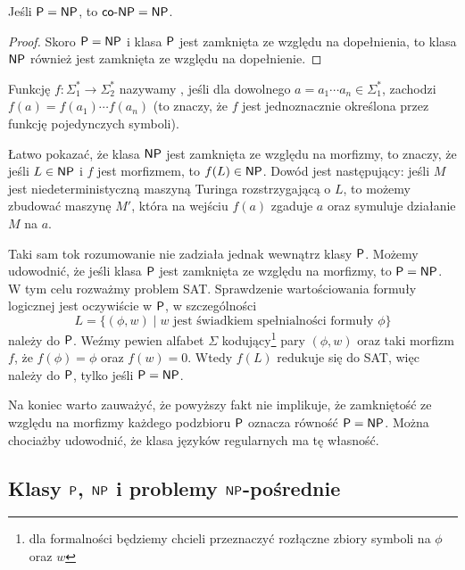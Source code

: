 \begin{theorem}
    Jeśli $\textsf{P} = \textsf{NP}$, to $\textsf{co-NP} = \textsf{NP}$.
\end{theorem}
\begin{proof}
    Skoro $\textsf{P} = \textsf{NP}$ i klasa $\textsf{P}$ jest zamknięta ze względu na dopełnienia, to klasa $\textsf{NP}$ również jest zamknięta ze względu na dopełnienie.
\end{proof}

\begin{remark}
    Funkcję $f : \Sigma_1^* \to \Sigma_2^*$ nazywamy , jeśli dla dowolnego $a = a_1 \cdots a_n \in \Sigma_1^*$, zachodzi $f(a) = f(a_1) \cdots f(a_n)$ (to znaczy, że $f$ jest jednoznacznie określona przez funkcję pojedynczych symboli).

    Łatwo pokazać, że klasa $\textsf{NP}$ jest zamknięta ze względu na morfizmy, to znaczy, że jeśli $L \in \textsf{NP}$ i $f$ jest morfizmem, to $f(L) \in \textsf{NP}$. Dowód jest następujący: jeśli $M$ jest niedeterministyczną maszyną Turinga rozstrzygającą o $L$, to możemy zbudować maszynę $M'$, która na wejściu $f(a)$ zgaduje $a$ oraz symuluje działanie $M$ na $a$.

    Taki sam tok rozumowanie nie zadziała jednak wewnątrz klasy $\textsf{P}$. Możemy udowodnić, że jeśli klasa $\textsf{P}$ jest zamknięta ze względu na morfizmy, to $\textsf{P} = \textsf{NP}$.
    W tym celu rozważmy problem SAT. Sprawdzenie wartościowania formuły logicznej jest oczywiście w $\textsf{P}$, w szczególności
    \[ L = \{(\phi, w) \mid w \text{ jest świadkiem spełnialności formuły } \phi \} \]
    należy do $\textsf{P}$. Weźmy pewien alfabet $\Sigma$ kodujący\footnote{dla formalności będziemy chcieli przeznaczyć rozłączne zbiory symboli na $\phi$ oraz $w$} pary $(\phi, w)$ oraz taki morfizm $f$, że $f(\phi) = \phi$ oraz $f(w) = 0$. Wtedy $f(L)$ redukuje się do SAT, więc należy do $\textsf{P}$, tylko jeśli $\textsf{P} = \textsf{NP}$.

    Na koniec warto zauważyć, że powyższy fakt nie implikuje, że zamkniętość ze względu na morfizmy każdego podzbioru $\textsf{P}$ oznacza równość $\textsf{P} = \textsf{NP}$. Można chociażby udowodnić, że klasa języków regularnych ma tę własność.
\end{remark}

\subsection{Klasy $\textsf{P}$, $\textsf{NP}$ i problemy $\textsf{NP}$-pośrednie}

